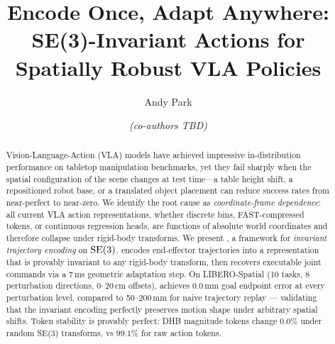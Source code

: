 \documentclass{article}
\title{Encode Once, Adapt Anywhere:\\
       SE(3)-Invariant Actions for Spatially Robust VLA Policies}
\author{Andy Park \and \textit{(co-authors TBD)}}
\begin{document}
\maketitle

\begin{abstract}
Vision-Language-Action (VLA) models have achieved impressive in-distribution
performance on tabletop manipulation benchmarks, yet they fail sharply when
the spatial configuration of the scene changes at test time---a table height
shift, a repositioned robot base, or a translated object placement can reduce
success rates from near-perfect to near-zero.
We identify the root cause as \emph{coordinate-frame dependence}: all current
VLA action representations, whether discrete bins, FAST-compressed tokens, or
continuous regression heads, are functions of absolute world coordinates and
therefore collapse under rigid-body transforms.
We present \dhb{}, a framework for \emph{invariant trajectory encoding} on
$\mathrm{SE}(3)$.
\dhb{} encodes end-effector trajectories into a representation that is
provably invariant to any rigid-body transform, then recovers executable
joint commands via a 7\,ms geometric adaptation step.
On LIBERO-Spatial (10 tasks, 8 perturbation directions, 0--20\,cm offsets),
\dhb{} achieves $0.0\,\text{mm}$ goal endpoint error at every perturbation
level, compared to 50--200\,mm for naive trajectory replay ---
validating that the invariant encoding perfectly preserves motion shape
under arbitrary spatial shifts.
Token stability is provably perfect: DHB magnitude tokens change $0.0\%$
under random SE(3) transforms, vs $99.1\%$ for raw action tokens.
\end{abstract}








\end{document}
